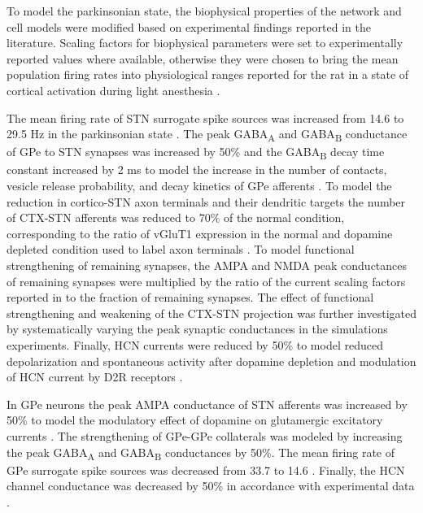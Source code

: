 To model the parkinsonian state, the biophysical properties of the network and cell models
were modified based on experimental findings reported in the literature.
Scaling factors for biophysical parameters were set to experimentally reported values
where available, otherwise they were chosen to bring the mean population firing rates
into physiological ranges reported for the rat in a state of cortical activation during light anesthesia \cite{mallet_disrupted_2008,kita_cortical_2011}.

%
The mean firing rate of STN surrogate spike sources was increased from 14.6 to 29.5 Hz in
the parkinsonian state \cite{mallet_disrupted_2008}.
%
The peak GABA\textsubscript{A} and GABA\textsubscript{B}
conductance of GPe to STN synapses was increased by 50\% and the GABA\textsubscript{B} decay time constant
increased by 2 ms to model the increase in the number of contacts, vesicle release
probability, and decay kinetics of GPe afferents \cite{fan_proliferation_2012}.
%
To model the reduction in cortico-STN axon terminals and their dendritic
targets \cite{chu_loss_2017,wang_impaired_2018} the number of CTX-STN afferents was
reduced to 70\% of the normal condition, corresponding to the ratio of vGluT1 expression
in the normal and dopamine depleted condition used to label axon
terminals \cite{chu_loss_2017}. To model functional strengthening of remaining synapses,
the AMPA and NMDA peak conductances of remaining synapses were multiplied by the ratio of
the current scaling factors reported in \cite{shen_dopamine_2005} to the fraction of remaining synapses.
The effect of functional strengthening and weakening of the CTX-STN projection was further investigated
by systematically varying the peak synaptic conductances in the simulations experiments.
%
Finally, HCN currents were reduced by 50\% to model reduced depolarization and spontaneous
activity after dopamine depletion \cite{cragg_synaptic_2004,zhu_pharmacological_2002} and
modulation of HCN current by D2R receptors \cite{yang_d2_2016}.
%

%
In GPe neurons the peak AMPA conductance of STN afferents was increased by 50\% to model
the modulatory effect of dopamine on glutamergic excitatory
currents \cite{hernandez_control_2006,johnson_gaba-_1997,kita_globus_2007}. The strengthening of GPe-GPe collaterals \cite{nevado-holgado_effective_2014,miguelez_altered_2012} was modeled by increasing the peak GABA\textsubscript{A} and GABA\textsubscript{B} conductances by 50\%. The mean firing rate of GPe surrogate spike sources was decreased from 33.7 to 14.6 \cite{mallet_parkinsonian_2008}. Finally, the HCN channel conductance was decreased by 50\% in accordance with experimental data \cite{chan_hcn_2011}.

